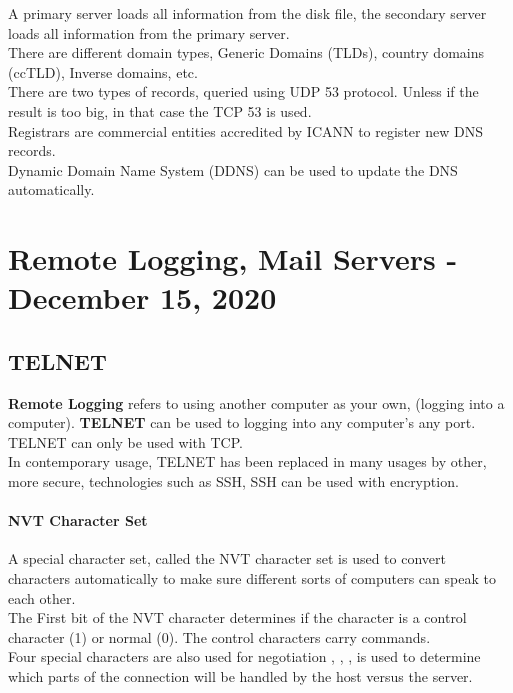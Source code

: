 \documentclass[11pt,a4paper,twoside]{book}
\begin{document}
A primary server loads all information from the disk file, the secondary server loads all information from the primary server.\\

There are different domain types, Generic Domains (TLDs), country domains (ccTLD), Inverse domains, etc.\\

There are two types of records, queried using UDP 53 protocol. Unless if the result is too big, in that case the TCP 53 is used.\\

Registrars are commercial entities accredited by ICANN to register new DNS records.\\

Dynamic Domain Name System (DDNS) can be used to update the DNS automatically.


\chapter{Remote Logging, Mail Servers - December 15, 2020}

\section{TELNET}

\textbf{Remote Logging} refers to using another computer as your own, (logging into a computer). \textbf{TELNET} can be used to logging into any computer's any port. TELNET can only be used with TCP.\\

In contemporary usage, TELNET has been replaced in many usages by other, more secure, technologies such as SSH, SSH can be used with encryption.\\

\subsubsection{NVT Character Set}

A special character set, called the NVT character set is used to convert characters automatically to make sure different sorts of computers can speak to each other.\\

The First bit of the NVT character determines if the character is a control character (1) or normal (0). The control characters carry commands.\\

Four special characters are also used for negotiation , , ,  is used to determine which parts of the connection will be handled by the host versus the server.
\end{document}
